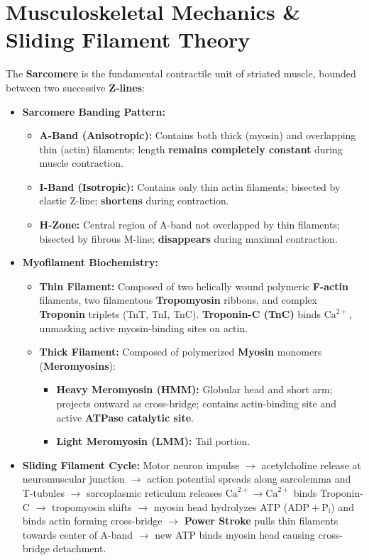 \documentclass[10pt,twoside,openright]{book}
\begin{document}
\section{Musculoskeletal Mechanics \& Sliding Filament Theory}

\begin{conceptbox}
The \textbf{Sarcomere} is the fundamental contractile unit of striated muscle, bounded between two successive \textbf{Z-lines}:
\begin{itemize}[leftmargin=*]
  \item \textbf{Sarcomere Banding Pattern:}
  \begin{itemize}
    \item \textbf{A-Band (Anisotropic):} Contains both thick (myosin) and overlapping thin (actin) filaments; length \textbf{remains completely constant} during muscle contraction.
    \item \textbf{I-Band (Isotropic):} Contains only thin actin filaments; bisected by elastic Z-line; \textbf{shortens} during contraction.
    \item \textbf{H-Zone:} Central region of A-band not overlapped by thin filaments; bisected by fibrous M-line; \textbf{disappears} during maximal contraction.
  \end{itemize}
  \item \textbf{Myofilament Biochemistry:}
  \begin{itemize}
    \item \textbf{Thin Filament:} Composed of two helically wound polymeric \textbf{F-actin} filaments, two filamentous \textbf{Tropomyosin} ribbons, and complex \textbf{Troponin} triplets (TnT, TnI, TnC). \textbf{Troponin-C (TnC)} binds $\mathrm{Ca}^{2+}$, unmasking active myosin-binding sites on actin.
    \item \textbf{Thick Filament:} Composed of polymerized \textbf{Myosin} monomers (\textbf{Meromyosins}):
    \begin{itemize}
      \item \textbf{Heavy Meromyosin (HMM):} Globular head and short arm; projects outward as cross-bridge; contains actin-binding site and active \textbf{ATPase catalytic site}.
      \item \textbf{Light Meromyosin (LMM):} Tail portion.
    \end{itemize}
  \end{itemize}
  \item \textbf{Sliding Filament Cycle:} Motor neuron impulse $\to$ acetylcholine release at neuromuscular junction $\to$ action potential spreads along sarcolemma and T-tubules $\to$ sarcoplasmic reticulum releases $\mathrm{Ca}^{2+} \to \mathrm{Ca}^{2+}$ binds Troponin-C $\to$ tropomyosin shifts $\to$ myosin head hydrolyzes ATP ($\mathrm{ADP} + \mathrm{P_i}$) and binds actin forming cross-bridge $\to$ \textbf{Power Stroke} pulls thin filaments towards center of A-band $\to$ new ATP binds myosin head causing cross-bridge detachment.
\end{itemize}
\end{conceptbox}
\end{document}

